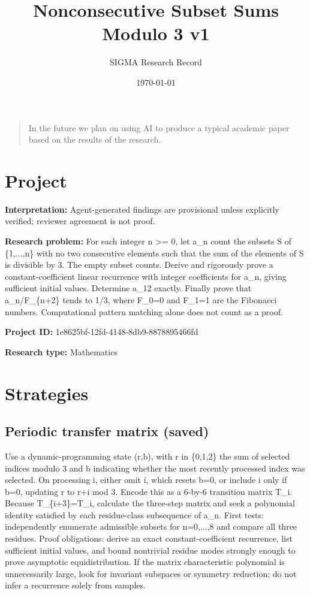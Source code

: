 \documentclass[11pt]{article}
\title{Nonconsecutive Subset Sums Modulo 3 v1}
\author{SIGMA Research Record}
\date{\today}
\begin{document}
\maketitle
\begin{quote}\small In the future we plan on using AI to produce a typical academic paper based on the results of the research.\end{quote}
\section{Project}
\textbf{Interpretation:} Agent-generated findings are provisional unless explicitly verified; reviewer agreement is not proof.\par
\textbf{Research problem:} For each integer n \textgreater{}= 0, let a\_n count the subsets S of \{1,...,n\} with no two consecutive elements such that the sum of the elements of S is divisible by 3. The empty subset counts. Derive and rigorously prove a constant-coefficient linear recurrence with integer coefficients for a\_n, giving sufficient initial values. Determine a\_12 exactly. Finally prove that a\_n/F\_\{n+2\} tends to 1/3, where F\_0=0 and F\_1=1 are the Fibonacci numbers. Computational pattern matching alone does not count as a proof.\par
\textbf{Project ID:} 1e8625bf-12fd-4148-8db9-8878895466fd\par
\textbf{Research type:} Mathematics\par
\section{Strategies}
\subsection{Periodic transfer matrix (saved)}
Use a dynamic-programming state (r,b), with r in \{0,1,2\} the sum of selected indices modulo 3 and b indicating whether the most recently processed index was selected. On processing i, either omit i, which resets b=0, or include i only if b=0, updating r to r+i mod 3. Encode this as a 6-by-6 transition matrix T\_i. Because T\_\{i+3\}=T\_i, calculate the three-step matrix and seek a polynomial identity satisfied by each residue-class subsequence of a\_n. First tests: independently enumerate admissible subsets for n=0,...,8 and compare all three residues. Proof obligations: derive an exact constant-coefficient recurrence, list sufficient initial values, and bound nontrivial residue modes strongly enough to prove asymptotic equidistribution. If the matrix characteristic polynomial is unnecessarily large, look for invariant subspaces or symmetry reduction; do not infer a recurrence solely from samples.\par
\end{document}
